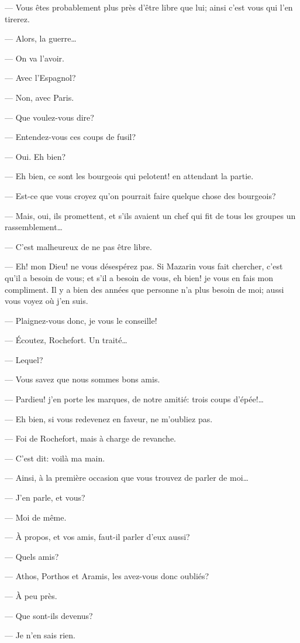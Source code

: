 — Vous êtes probablement plus près d'être libre que lui; ainsi c'est vous qui l'en tirerez.

— Alors, la guerre\dots

— On va l'avoir.

— Avec l'Espagnol?

— Non, avec Paris.

— Que voulez-vous dire?

— Entendez-vous ces coups de fusil?

— Oui. Eh bien?

— Eh bien, ce sont les bourgeois qui pelotent! en attendant la partie.

— Est-ce que vous croyez qu'on pourrait faire quelque chose des bourgeois?

— Mais, oui, ils promettent, et s'ils avaient un chef qui fit de tous les groupes un rassemblement\dots

— C'est malheureux de ne pas être libre.

— Eh! mon Dieu! ne vous désespérez pas. Si Mazarin vous fait chercher, c'est qu'il a besoin de vous; et s'il a besoin de vous, eh bien! je vous en fais mon compliment. Il y a bien des années que personne n'a plus besoin de moi; aussi vous voyez où j'en suis.

— Plaignez-vous donc, je vous le conseille!

— Écoutez, Rochefort. Un traité\dots

— Lequel?

— Vous savez que nous sommes bons amis.

— Pardieu! j'en porte les marques, de notre amitié: trois coups d'épée!\dots

— Eh bien, si vous redevenez en faveur, ne m'oubliez pas.

— Foi de Rochefort, mais à charge de revanche.

— C'est dit: voilà ma main.

— Ainsi, à la première occasion que vous trouvez de parler de moi\dots

— J'en parle, et vous?

— Moi de même.

— À propos, et vos amis, faut-il parler d'eux aussi?

— Quels amis?

— Athos, Porthos et Aramis, les avez-vous donc oubliés?

— À peu près.

— Que sont-ils devenus?

— Je n'en sais rien.

